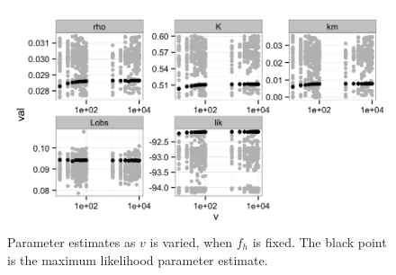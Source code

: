 \documentclass[12pt,reqno,final,pdftex]{amsart}\usepackage[]{graphicx}\usepackage[]{color}
\newenvironment{knitrout}{}{} %
\theoremstyle{plain}
\numberwithin{equation}{part}
\begin{document}
\begin{knitrout}\scriptsize
{}\color{fgcolor}\begin{figure}

\includegraphics[width=\linewidth]{figure/v-profile-lik-1} \hfill{}

\caption[Parameter estimates as ]{Parameter estimates as $v$ is varied, when $f_h$ is fixed. The black point is the maximum likelihood parameter estimate.}\label{fig:v-profile-lik}
\end{figure}


\end{knitrout}
\end{document}
